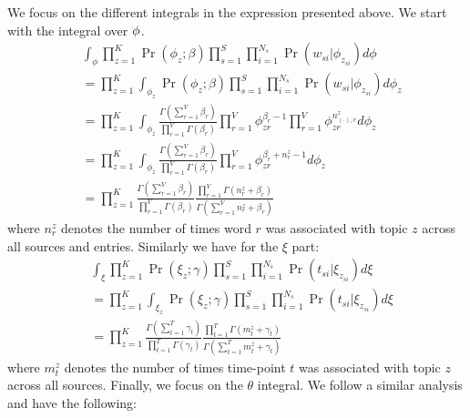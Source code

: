 \documentclass[conference]{IEEEtran}
\begin{document}
We focus on the different integrals in the expression presented above. We start with the integral over ${\bf \phi}$. 
{\scriptsize
\begin{align}
& \int_{\phi} \prod_{z = 1}^{K}\Pr(\phi_z;\beta) \prod_{s = 1}^{S}\prod_{i = 1}^{N_s}\Pr(w_{si}|\phi_{z_{si}}) d\phi \nonumber \\
& =  \prod_{z = 1}^{K} \int_{\phi_{z}} \Pr(\phi_z;\beta) \prod_{s = 1}^{S}\prod_{i = 1}^{N_s}\Pr(w_{si}|\phi_{z_{si}}) d\phi_{z} \nonumber \\
&= \prod_{z = 1}^{K} \int_{\phi_z} \frac{\Gamma(\sum_{r = 1}^V \beta_r)}{\prod_{r = 1}^V \Gamma(\beta_r)}\prod_{r = 1}^V \phi_{zr}^{\beta_r -1} \prod_{r = 1}^V \phi_{zr}^{n^{z}_{(\cdot),r}} d\phi_z \nonumber \\
&= \prod_{z = 1}^{K} \int_{\phi_z} \frac{\Gamma(\sum_{r = 1}^V \beta_r)}{\prod_{r = 1}^V \Gamma(\beta_r)}\prod_{r = 1}^V \phi_{zr}^{\beta_r  + n^{z}_{r} -1} d\phi_z \nonumber \\
& = \prod_{z = 1}^K \frac{\Gamma(\sum_{r = 1}^V \beta_r)}{\prod_{r = 1}^V \Gamma(\beta_r)} \frac{\prod_{r = 1}^V \Gamma(n^{z}_{r} + \beta_r)}{\Gamma(\sum_{r =1}^V n^{z}_{r} + \beta_r)} \nonumber
\end{align}}
where $n^{z}_{r}$ denotes the number of times word $r$ was associated with topic $z$ across all sources and entries. Similarly we have for the $\xi$ part:
{\scriptsize
\begin{align}
&\int_{\xi} \prod_{z = 1}^{K} \Pr(\xi_z;\gamma)\prod_{s = 1}^{S}\prod_{i = 1}^{N_s}\Pr(t_{si}|\xi_{z_{si}}) d\xi \nonumber \\
&= \prod_{z = 1}^K \int_{\xi_z} \Pr(\xi_z;\gamma)\prod_{s = 1}^{S}\prod_{i = 1}^{N_s}\Pr(t_{si}|\xi_{z_{si}}) d\xi \nonumber \\
& = \prod_{z = 1}^K \frac{\Gamma(\sum_{t = 1}^T \gamma_t)}{\prod_{t = 1}^T \Gamma(\gamma_t)} \frac{\prod_{t = 1}^T \Gamma(m^{z}_{t} + \gamma_t)}{\Gamma(\sum_{t =1}^T m^{z}_{t} + \gamma_t)} \nonumber
\end{align}}
where $m^{z}_{t}$ denotes the number of times time-point $t$ was associated with topic $z$ across all sources. Finally, we focus on the $\theta$ integral. We follow a similar analysis and have the following:
\end{document}
